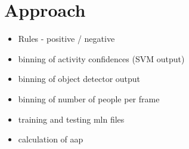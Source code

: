 \chapter{Approach}
\label{ch4_APPROACH}

\begin{itemize}
	\item Rules - positive / negative
	\item binning of activity confidences (SVM output)
	\item binning of object detector output
	\item binning of number of people per frame
	\item training and testing mln files
	\item calculation of aap
\end{itemize}
